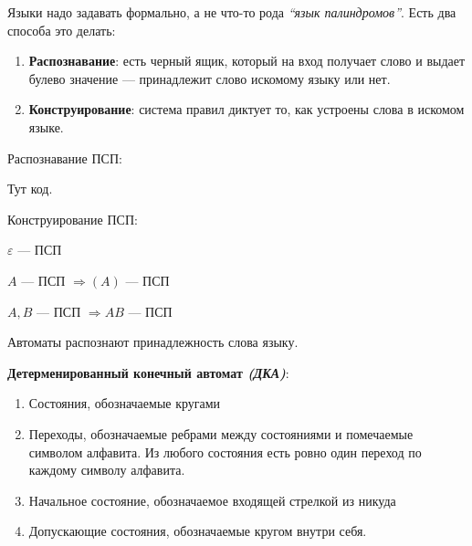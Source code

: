Языки надо задавать формально, а не что-то рода \textit{``язык палиндромов''}. Есть два способа это делать:
\begin{enumerate}
    \item \textbf{Распознавание}: есть черный ящик, который на вход получает слово и выдает булево значение --- принадлежит слово искомому языку или нет.
    \item \textbf{Конструирование}: система правил диктует то, как устроены слова в искомом языке.
\end{enumerate}

\begin{example}
    Распознавание ПСП:

    Тут код.
\end{example}

\begin{example}
    Конструирование ПСП:

    $\varepsilon$ --- ПСП
    
    $A$ --- ПСП $\Rightarrow (A)$ --- ПСП

    $A, B$ --- ПСП $\Rightarrow AB$ --- ПСП
\end{example}

Автоматы распознают принадлежность слова языку.
\begin{definition}
    \textbf{Детерменированный конечный автомат \textit{(ДКА)}}:
    \begin{enumerate}
        \item Состояния, обозначаемые кругами
        \item Переходы, обозначаемые ребрами между состояниями и помечаемые символом алфавита. Из любого состояния есть ровно один переход по каждому символу алфавита.
        \item Начальное состояние, обозначаемое входящей стрелкой из никуда
        \item Допускающие состояния, обозначаемые кругом внутри себя.
    \end{enumerate}
\end{definition}

